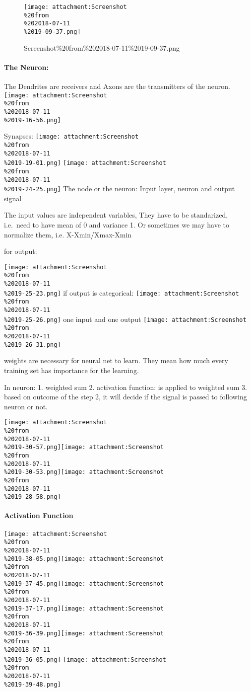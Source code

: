 \documentclass[11pt]{article}
\makeatletter
\def\maxwidth{\ifdim\Gin@nat@width>\linewidth\linewidth
    \else\Gin@nat@width\fi}
\let\Oldincludegraphics\includegraphics
\renewcommand{\includegraphics}[1]{\Oldincludegraphics[width=.8\maxwidth]{#1}}
\makeatother
\begin{document}
\begin{figure}
\centering
\texttt{[image: attachment:Screenshot\\\%20from\\\%202018-07-11\\\%2019-09-37.png]}
\caption{Screenshot\%20from\%202018-07-11\%2019-09-37.png}
\end{figure}

    \hypertarget{the-neuron}{%
\paragraph{The Neuron:}\label{the-neuron}}

The Dendrites are receivers and Axons are the transmitters of the
neuron.
\texttt{[image: attachment:Screenshot\\\%20from\\\%202018-07-11\\\%2019-16-56.png]}

Synapses:
\texttt{[image: attachment:Screenshot\\\%20from\\\%202018-07-11\\\%2019-19-01.png]}
\texttt{[image: attachment:Screenshot\\\%20from\\\%202018-07-11\\\%2019-24-25.png]}
The node or the neuron: Input layer, neuron and output signal

The input values are independent variables, They have to be standarized,
i.e.~need to have mean of 0 and variance 1. Or sometimes we may have to
normalize them, i.e. X-Xmin/Xmax-Xmin

for output:

\texttt{[image: attachment:Screenshot\\\%20from\\\%202018-07-11\\\%2019-25-23.png]}
if output is categorical:
\texttt{[image: attachment:Screenshot\\\%20from\\\%202018-07-11\\\%2019-25-26.png]}
one input and one output
\texttt{[image: attachment:Screenshot\\\%20from\\\%202018-07-11\\\%2019-26-31.png]}

weights are necessary for neural net to learn. They mean how much every
training set has importance for the learning.

In neuron: 1. weighted sum 2. activation function: is applied to
weighted sum 3. based on outcome of the step 2, it will decide if the
signal is passed to following neuron or not.

\texttt{[image: attachment:Screenshot\\\%20from\\\%202018-07-11\\\%2019-30-57.png]}\texttt{[image: attachment:Screenshot\\\%20from\\\%202018-07-11\\\%2019-30-53.png]}\texttt{[image: attachment:Screenshot\\\%20from\\\%202018-07-11\\\%2019-28-58.png]}

\hypertarget{activation-function}{%
\paragraph{Activation Function}\label{activation-function}}

\texttt{[image: attachment:Screenshot\\\%20from\\\%202018-07-11\\\%2019-38-05.png]}\texttt{[image: attachment:Screenshot\\\%20from\\\%202018-07-11\\\%2019-37-45.png]}\texttt{[image: attachment:Screenshot\\\%20from\\\%202018-07-11\\\%2019-37-17.png]}\texttt{[image: attachment:Screenshot\\\%20from\\\%202018-07-11\\\%2019-36-39.png]}\texttt{[image: attachment:Screenshot\\\%20from\\\%202018-07-11\\\%2019-36-05.png]}
\texttt{[image: attachment:Screenshot\\\%20from\\\%202018-07-11\\\%2019-39-48.png]}
\end{document}
